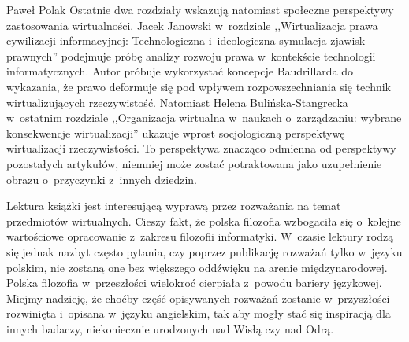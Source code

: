 \begin{recplenv}{Paweł Polak}
Ostatnie dwa rozdziały wskazują natomiast społeczne perspektywy zastosowania wirtualności. Jacek Janowski w~rozdziale ,,Wirtualizacja prawa cywilizacji informacyjnej: Technologiczna i~ideologiczna symulacja zjawisk prawnych'' podejmuje próbę analizy rozwoju prawa w~kontekście technologii informatycznych. Autor próbuje wykorzystać koncepcje Baudrillarda do wykazania, że prawo deformuje się pod wpływem rozpowszechniania się technik wirtualizujących rzeczywistość. Natomiast Helena Bulińska-Stangrecka w~ostatnim rozdziale ,,Organizacja wirtualna w~naukach o~zarządzaniu: wybrane konsekwencje wirtualizacji'' ukazuje wprost socjologiczną perspektywę wirtualizacji rzeczywistości. To perspektywa znacząco odmienna od perspektywy pozostałych artykułów, niemniej może zostać potraktowana jako uzupełnienie obrazu o~przyczynki z~innych dziedzin.

Lektura książki jest interesującą wyprawą przez rozważania na temat przedmiotów wirtualnych. Cieszy fakt, że polska filozofia wzbogaciła się o~kolejne wartościowe opracowanie z~zakresu filozofii informatyki. W~czasie lektury rodzą się jednak nazbyt często pytania, czy poprzez publikację rozważań tylko w~języku polskim, nie zostaną one bez większego oddźwięku na arenie międzynarodowej. Polska filozofia w~przeszłości wielokroć cierpiała z~powodu bariery językowej. Miejmy nadzieję, że choćby część opisywanych rozważań zostanie w~przyszłości rozwinięta i~opisana w~języku angielskim, tak aby mogły stać się inspiracją dla innych badaczy, niekoniecznie urodzonych nad Wisłą czy nad Odrą.





\end{recplenv}